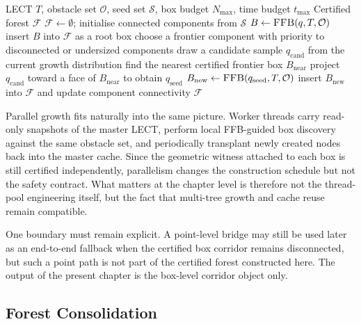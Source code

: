 \documentclass[journal]{IEEEtran}
\newcommand{\calO}{\ensuremath{\mathcal{O}}}
\begin{document}
\begin{algorithm}[t]
\caption{Certified Forest Growth}
\label{alg:forest_growth}
\footnotesize
\begin{algorithmic}[1]
\REQUIRE LECT $T$, obstacle set $\calO$, seed set $\mathcal{S}$, box budget $N_{\max}$, time budget $t_{\max}$
\ENSURE Certified forest $\mathcal{F}$
\STATE $\mathcal{F} \gets \emptyset$; initialise connected components from $\mathcal{S}$
  \STATE $B \gets \textsc{FFB}(q, T, \calO)$
    \STATE insert $B$ into $\mathcal{F}$ as a root box
  \ENDIF
\ENDFOR
{}
  \STATE choose a frontier component with priority to disconnected or undersized components
  \STATE draw a candidate sample $q_{\mathrm{cand}}$ from the current growth distribution
  \STATE find the nearest certified frontier box $B_{\mathrm{near}}$
  \STATE project $q_{\mathrm{cand}}$ toward a face of $B_{\mathrm{near}}$ to obtain $q_{\mathrm{seed}}$
  \STATE $B_{\mathrm{new}} \gets \textsc{FFB}(q_{\mathrm{seed}}, T, \calO)$
    \STATE insert $B_{\mathrm{new}}$ into $\mathcal{F}$ and update component connectivity
  \ENDIF
\ENDWHILE
\STATE \RETURN $\mathcal{F}$
\end{algorithmic}
\end{algorithm}

Parallel growth fits naturally into the same picture. Worker threads carry
read-only snapshots of the master LECT, perform local FFB-guided box discovery
against the same obstacle set, and periodically transplant newly created nodes
back into the master cache. Since the geometric witness attached to each box is
still certified independently, parallelism changes the construction schedule
but not the safety contract. What matters at the chapter level is therefore not
the thread-pool engineering itself, but the fact that multi-tree growth and
cache reuse remain compatible.

One boundary must remain explicit. A point-level bridge may still be used later
as an end-to-end fallback when the certified box corridor remains disconnected,
but such a point path is not part of the certified forest constructed here. The
output of the present chapter is the box-level corridor object only.

\subsection{Forest Consolidation}\label{sec:forest_consolidation}
\end{document}
